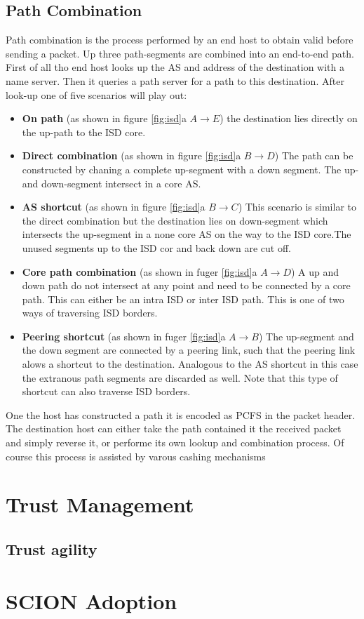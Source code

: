 \documentclass[../eva1_scion.tex]{subfiles}
\begin{document}
    \subsection{Path Combination} \label{ssec:path_assembly}
    Path combination is the process performed by an end host to obtain valid before sending a packet. Up three path-segments are combined into an end-to-end path. First of all tho end host looks up the AS and address of the destination with a name server. Then it queries a path server for a path to this destination. After look-up one of five scenarios will play out:
    \begin{itemize}
        \item \textbf{On path} (as shown in figure \ref{fig:isd}a $A \rightarrow E$) the destination lies directly on the up-path to the ISD core.
        \item \textbf{Direct combination} (as shown in figure \ref{fig:isd}a $B \rightarrow D$) The path can be constructed by chaning a complete up-segment with a down segment. The up- and down-segment intersect in a core AS.
        \item \textbf{AS shortcut} (as shown in figure \ref{fig:isd}a $B \rightarrow C$) This scenario is similar to the direct combination but the destination lies on down-segment which intersects the up-segment in a none core AS on the way to the ISD core.The unused segments up to the ISD cor and back down are cut off.
        \item \textbf{Core path combination} (as shown in fuger \ref{fig:isd}a $A \rightarrow D$) A up and down path do not intersect at any point and need to be connected by a core path. This can either be an intra ISD or inter ISD path. This is one of two ways of traversing ISD borders.
        \item \textbf{Peering shortcut} (as shown in fuger \ref{fig:isd}a $A \rightarrow B$) The up-segment and the down segment are connected by a peering link, such that the peering link alows a shortcut to the destination. Analogous to the AS shortcut in this case the extranous path segments are discarded as well. Note that this type of shortcut can also traverse ISD borders.
    \end{itemize}
    
    One the host has constructed a path it is encoded as PCFS in the packet header. The destination host can either take the path contained it the received packet and simply reverse it, or performe its own lookup and combination process. Of course this process is assisted by varous cashing mechanisms 
    \section{Trust Management}
    \subsection{Trust agility}
    \section{SCION Adoption}
\end{document}
